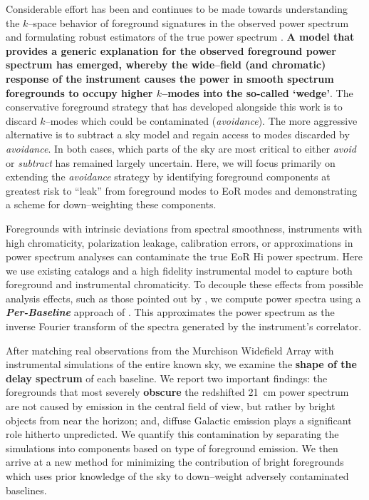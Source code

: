 \documentclass[preprint2,iop,numberedappendix]{emulateapj}
\begin{document}
Considerable effort has been and continues to be made towards understanding the $k$--space behavior of foreground signatures in the observed power spectrum and formulating robust estimators of the true power spectrum \citep{bow09,liu09,dat10,liu11,mor12,tro12,pob13,thy13,dil14,liu14a,liu14b}. {\bf A model that provides a generic explanation for the observed foreground power spectrum has emerged, whereby the wide--field (and chromatic) response of the instrument causes the power in smooth spectrum foregrounds to occupy higher $k$--modes into the so-called `wedge'}. %
The conservative foreground strategy that has developed alongside this work is to discard $k$--modes which could be contaminated ({\it avoidance}). The more aggressive alternative is to subtract a sky model and regain access to modes discarded by {\it avoidance}. In both cases, which parts of the sky are most critical to either {\it avoid} or {\it subtract} has remained largely uncertain. Here, we will focus primarily on extending the {\it avoidance} strategy by identifying foreground components at greatest risk to ``leak'' from foreground modes to EoR modes and demonstrating a scheme for down--weighting these components.

Foregrounds with intrinsic deviations from spectral smoothness, instruments with high chromaticity, polarization leakage, calibration errors, or approximations in power spectrum analyses can contaminate the true EoR H{\sc i} power spectrum. Here we use existing catalogs and a high fidelity instrumental model to capture both foreground and instrumental chromaticity. To decouple these effects from possible analysis effects, such as those pointed out by \citet{haz13}, we compute power spectra using a {\it \textbf{Per-Baseline}} approach of \citet{par12b}. This approximates the power spectrum as the inverse Fourier transform of the spectra generated by the instrument's correlator. 

After matching real observations from the Murchison Widefield Array with instrumental simulations of the entire known sky, we examine the {\bf shape of the delay spectrum} of each baseline. We report two important findings: the foregrounds that most severely {\bf obscure} the redshifted 21~cm power spectrum are not caused by emission in the central field of view, but rather by bright objects from near the horizon; and, diffuse Galactic emission plays a significant role hitherto unpredicted. We quantify this contamination by separating the simulations into components based on type of foreground emission. We then arrive at a new method for minimizing the contribution of bright foregrounds which uses prior knowledge of the sky to down--weight adversely contaminated baselines.
\end{document}
